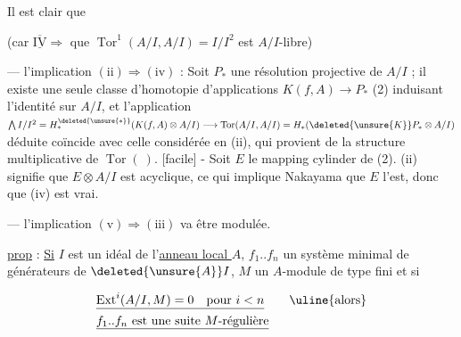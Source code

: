 Il est clair que


(car $\overline{\underline{\mathrm{IV}}}\Rightarrow$ que $\operatorname{Tor}^1(A/I,A/I)=I/I^2$ est $A/I$-libre)

--- l'implication \uline{$\mathrm{(ii)}\Rightarrow\mathrm{(iv)}$} : Soit $P_*$ une résolution projective de $A/I$ ; il existe une seule classe d'homotopie d'applications $K(f,A)\longrightarrow P_*$ (2) induisant l'identité sur $A/I$, et l'application $\bigwedge I/I^2=H_{\ast}^{\deleted{\unsure{*}}}(K(f,A)\otimes A/I)\longrightarrow\operatorname{Tor}(A/I,A/I)=H_*(\deleted{\unsure{K}}P_*\otimes A/I)$ déduite coïncide avec celle considérée en (ii), qui provient de la structure multiplicative de $\operatorname{Tor}(\ )$. [facile] - Soit $E$ le mapping cylinder de (2). (ii) signifie que $E\otimes A/I$ est acyclique, ce qui implique  Nakayama que $E$ l'est, donc que (iv) est vrai.

--- l'implication \uline{$\mathrm{(v)}\Rightarrow\mathrm{(iii)}$} va être modulée.

\uline{prop} : \uline{Si} $I$ est un idéal de l'\uline{anneau local $A$}, $f_1..f_n$ un système minimal de générateurs de $\deleted{\unsure{A}}I$, $M$ un $A$-module de type fini et si

\[
\begin{aligned}
&\underline{\operatorname{Ext}^i(A/I,M)=0\quad\text{pour }i<n}\qquad\text{\uline{alors}}\\
&\underline{f_1..f_n\text{ est une suite }M\text{-régulière}}
\end{aligned}
\]
